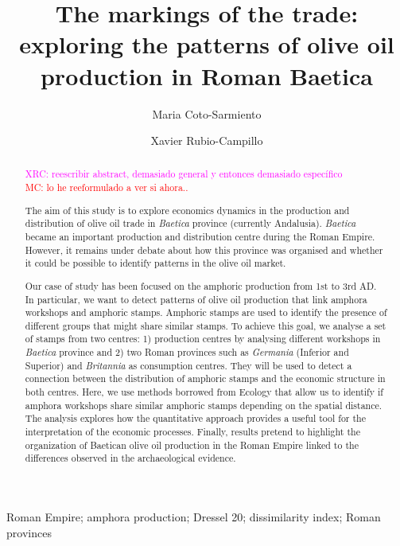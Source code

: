 \documentclass[review]{elsarticle}
\newcommand{\memo}[2]{\textcolor{#1}{#2}}
\newcommand{\maria}[1]{\memo{red}{MC: #1\\}}
\newcommand{\xavi}[1]{\memo{magenta}{XRC: #1\\}}
\begin{document}
\begin{frontmatter}

\title{The markings of the trade: exploring the patterns of olive oil production in Roman Baetica}

\author[ceipacadress]{Maria Coto-Sarmiento}


\author[edadress]{Xavier Rubio-Campillo}

\address[ceipacadress]{CEIPAC, Department of Prehistory and Archaeology, Montalegre, 6-8, 08001, University of Barcelona, Barcelona, Spain}
\address[edadress]{School of History, Classic \& Archaeology, Room OOM.33, William Robertson Wing, Old Medical School, Teviot Place, University of Edinburgh, UK}

\begin{keyword}
Roman Empire; amphora production; Dressel 20; dissimilarity index; Roman provinces
\end{keyword}


\begin{abstract}

\xavi{reescribir abstract, demasiado general y entonces demasiado específico}
\maria{lo he reeformulado a ver si ahora..}


The aim of this study is to explore economics dynamics in the production and distribution of olive oil trade in \textit{Baetica} province (currently Andalusia). \textit{Baetica} became an important production and distribution centre during the Roman Empire. However, it remains under debate about how this province was organised and whether it could be possible to identify patterns in the olive oil market. 

Our case of study has been focused on the amphoric production from 1st to 3rd AD. In particular, we want to detect patterns of olive oil production that link amphora workshops and amphoric stamps. Amphoric stamps are used to identify the presence of different groups that might share similar stamps. To achieve this goal, we analyse a set of stamps from two centres: 1) production centres by analysing different workshops in \textit{Baetica} province and 2) two Roman provinces such as \textit{Germania} (Inferior and Superior) and \textit{Britannia} as consumption centres. They will be used to detect a connection between the distribution of amphoric stamps and the economic structure in both centres. Here, we use methods borrowed from Ecology that allow us to identify if amphora workshops share similar amphoric stamps depending on the spatial distance. The analysis explores how the quantitative approach provides a useful tool for the interpretation of the economic processes. Finally, results pretend to highlight the organization of Baetican olive oil production in the Roman Empire linked to the differences observed in the archaeological evidence.



\end{abstract}
\end{frontmatter}
\end{document}

